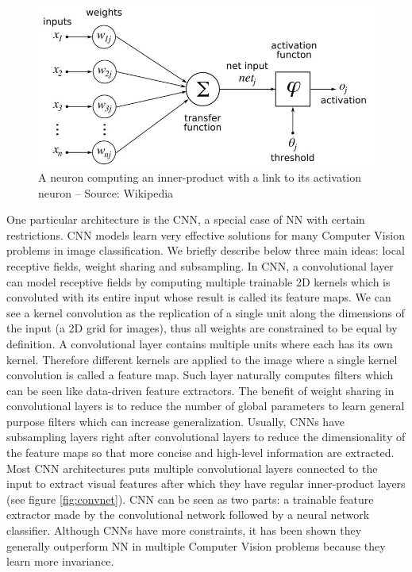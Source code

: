 \documentclass[a4paper,12pt]{report}
\begin{document}
\begin{figure}[t]
    \begin{center}
        \includegraphics{thesis_figures/800px-ArtificialNeuronModel_english.jpg}
    \end{center}
    \caption{A neuron computing an inner-product with a link to its activation neuron -- Source: Wikipedia}
    \label{fig:artificial_neurons}
\end{figure}

One particular architecture is the CNN, a special case of NN with certain restrictions.
CNN models learn very effective solutions for many Computer Vision problems in image classification.
We briefly describe below three main ideas: local receptive fields, weight sharing and subsampling.
In CNN, a convolutional layer can model receptive fields by computing multiple trainable 2D kernels which is convoluted with its entire input whose result is called its feature maps.
We can see a kernel convolution as the replication of a single unit along the dimensions of the input (a 2D grid for images), thus all weights are constrained to be equal by definition.
A convolutional layer contains multiple units where each has its own kernel.
Therefore different kernels are applied to the image where a single kernel convolution is called a feature map.
Such layer naturally computes filters which can be seen like data-driven feature extractors.
The benefit of weight sharing in convolutional layers is to reduce the number of global parameters to learn general purpose filters which can increase generalization.
Usually, CNNs have subsampling layers right after convolutional layers to reduce the dimensionality of the feature maps so that more concise and high-level information are extracted.
Most CNN architectures puts multiple convolutional layers connected to the input to extract visual features after which they have regular inner-product layers (see figure \ref{fig:convnet}).
CNN can be seen as two parts: a trainable feature extractor made by the convolutional network followed by a neural network classifier.
Although CNNs have more constraints, it has been shown they generally outperform NN in multiple Computer Vision problems because they learn more invariance\cite{simard2003best}\cite{mnist_web}\cite{lawrence1997face}\cite{krizhevsky2012imagenet}.
\end{document}
